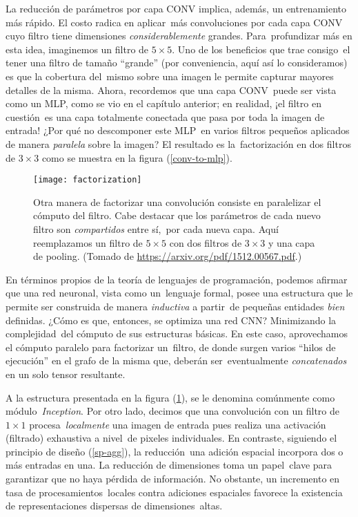 La reducción de parámetros por capa CONV implica, además, un entrenamiento más rápido. El costo radica en aplicar\
más convoluciones por cada capa CONV cuyo filtro tiene dimensiones \emph{considerablemente} grandes. Para\
profundizar más en esta idea, imaginemos un filtro de $5 \times 5$. Uno de los beneficios que trae consigo\
el tener una filtro de tamaño ``grande'' (por conveniencia, aquí así lo consideramos) es que la cobertura del\
mismo sobre una imagen le permite capturar mayores detalles de la misma. Ahora, recordemos que una capa CONV\
puede ser vista como un MLP, como se vio en el capítulo anterior; en realidad, ¡el filtro en cuestión\
es una capa totalmente conectada que pasa por toda la imagen de entrada! ¿Por qué no descomponer este MLP\
en varios filtros pequeños aplicados de manera \emph{paralela} sobre la imagen? El resultado es la\
factorización en dos filtros de $3 \times 3$ como se muestra en la figura (\ref{conv-to-mlp}).\par

\begin{figure}[H]
  \centering
  \texttt{[image: factorization]}
  \caption{Otra manera de factorizar una convolución consiste en paralelizar el cómputo del filtro.
    Cabe destacar que los parámetros de cada nuevo filtro son \emph{compartidos} entre sí,\
    por cada nueva capa. Aquí reemplazamos un filtro de $5 \times 5$ con dos filtros de $3 \times 3$
    y una capa de pooling.
    (Tomado de \url{https://arxiv.org/pdf/1512.00567.pdf}.)}
  \label{factorization}
\end{figure}

En términos propios de la teoría de lenguajes de programación, podemos afirmar que una red neuronal, vista como un\
lenguaje formal, posee una estructura que le permite ser construida de manera \emph{inductiva} a partir\
de pequeñas entidades \emph{bien} definidas. ¿Cómo es que, entonces, se optimiza una red CNN? Minimizando la complejidad\
del cómputo de sus estructuras básicas. En este caso, aprovechamos el cómputo paralelo para factorizar un\
filtro, de donde surgen varios ``hilos de ejecución'' en el grafo de la misma que, deberán ser\
eventualmente \emph{concatenados} en un solo tensor resultante.\par
A la estructura presentada en la figura (\ref{factorization}), se le denomina comúnmente como módulo\
\emph{Inception}. Por otro lado, decimos que una convolución con un filtro de $1 \times 1$ procesa\
\emph{localmente} una imagen de entrada pues realiza una activación (filtrado) exhaustiva a nivel\
de pixeles individuales. En contraste, siguiendo el principio de diseño (\ref{sp-agg}), la reducción\
una adición espacial incorpora dos o más entradas en una. La reducción de dimensiones toma un papel\
clave para garantizar que no haya pérdida de información. No obstante, un incremento en tasa de procesamientos\
locales contra adiciones espaciales favorece la existencia de representaciones dispersas de dimensiones\
altas.


